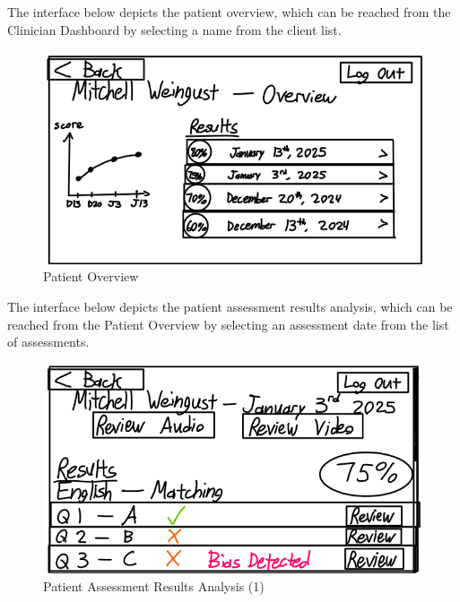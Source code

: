 \documentclass[12pt, titlepage]{article}
\begin{document}
\hspace{1.5em}The interface below depicts the patient overview, which can be reached from the Clinician Dashboard by selecting a name from the client list.
\begin{figure}[H]
  \centering
  \includegraphics[scale=0.9]{images/Patient-Overview.png}
  \caption{Patient Overview}
\end{figure}

\hspace{1.5em}The interface below depicts the patient assessment results analysis, which can be reached from the Patient Overview by selecting an assessment date from the list of assessments.
\begin{figure}[H]
  \centering
  \includegraphics[scale=0.9]{images/Patient-Assessment-Results-Analysis-1.png}
  \caption{Patient Assessment Results Analysis (1)}
\end{figure}
\end{document}
